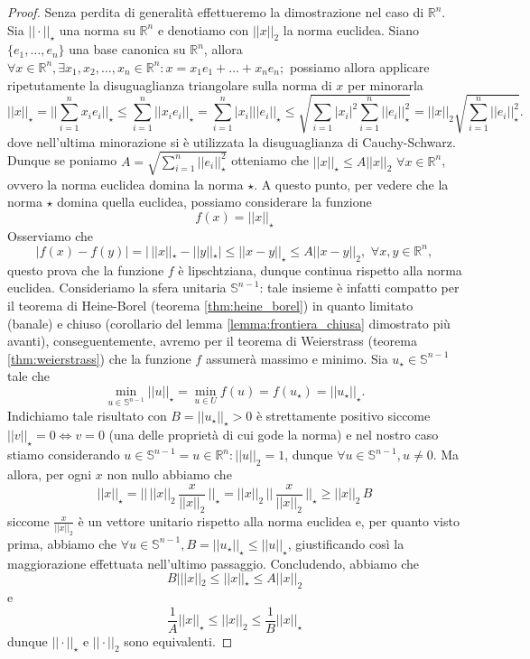 \begin{proof}
    Senza perdita di generalità effettueremo la dimostrazione nel caso di $\mathbb{R}^n$. Sia $|| \cdot ||_{\star}$ una norma su $\mathbb{R}^n$ e denotiamo con $||x||_2$ la norma euclidea. Siano $\{e_1, \ldots, e_n \}$ una base canonica su $\mathbb{R}^n$, allora $\forall x \in \mathbb{R}^n, \exists x_1, x_2, \ldots, x_n \in \mathbb{R}^n : x = x_1 e_1 + \ldots + x_n e_n;$ possiamo allora
    applicare ripetutamente la disuguaglianza triangolare sulla norma di $x$ per minorarla
    $$
    ||x||_{\star} = ||\sum_{i=1}^n x_i e_i ||_{\star} \leq \sum_{i=1}^n ||x_i e_i||_{\star} = \sum_{i=1}^n |x_i| ||e_i||_{\star} \leq \sqrt{\sum_{i=1} |x_i|^2 \sum_{i=1}^n ||e_i||^2_{\star}} = ||x||_2 \sqrt{\sum_{i=1}^n ||e_i||^2_{\star}}.
    $$
    dove nell'ultima minorazione si è utilizzata la disuguaglianza di Cauchy-Schwarz. \\
    Dunque se poniamo $A = \sqrt{\sum\limits_{i=1}^n ||e_i||^2_{\star}}$ otteniamo che $||x||_{\star} \leq A||x||_2 \, \, \forall x \in \mathbb{R}^n$, ovvero la norma euclidea domina la norma $\star$. A questo punto, per vedere che la norma $\star$ domina quella euclidea, possiamo considerare la funzione
    $$
    f(x) = ||x||_{\star}
    $$
    Osserviamo che
    $$
    |f(x) - f(y)| = | \, ||x||_{\star} - ||y||_{\star}| \leq ||x-y||_{\star} \leq A||x-y||_2, \, \, \forall x, y \in \mathbb{R}^n,
    $$
    questo prova che la funzione $f$ è lipschtziana, dunque continua rispetto alla norma euclidea. Consideriamo la sfera unitaria $\mathbb{S}^{n-1}$: tale insieme è infatti compatto per il teorema di Heine-Borel (teorema \ref{thm:heine_borel}) in quanto limitato (banale) e chiuso (corollario del lemma \ref{lemma:frontiera_chiusa} dimostrato più avanti), conseguentemente, avremo per il teorema di Weierstrass (teorema \ref{thm:weierstrass}) che 
    la funzione $f$ assumerà massimo e minimo. Sia $u_{\star} \in \mathbb{S}^{n-1}$ tale che
    $$
        \min_{u \in \mathbb{S}^{n-1}} ||u||_{\star} = \min_{u \in U} f(u) = f(u_{\star}) = ||u_{\star}||_{\star}.
    $$
    Indichiamo tale risultato con $B = ||u_{\star}||_{\star} > 0$ è strettamente positivo siccome $||v||_{\star} = 0 \iff v = 0$ (una delle proprietà di cui gode la norma) e nel nostro caso stiamo considerando $u \in \mathbb{S}^{n-1} = {u \in \mathbb{R}^n : ||u||_2 = 1}$, dunque $\forall u \in \mathbb{S}^{n-1}, u \neq 0$. Ma allora, per ogni $x$ non nullo abbiamo che
    $$
    ||x||_{\star} = || \, ||x||_2 \, \frac{x}{||x||_2} \, ||_{\star} = ||x||_2 \, || \, \frac{x}{||x||_2} \, ||_{\star} \geq ||x||_2 \, B
    $$
    siccome $\frac{x}{||x||_2}$ è un vettore unitario rispetto alla norma euclidea e, per quanto visto prima, abbiamo che $\forall u \in \mathbb{S}^{n-1}, B = ||u_{\star}||_{\star} \leq ||u||_{\star}$, giustificando così la maggiorazione effettuata nell'ultimo passaggio. Concludendo, abbiamo che
    $$
        B |||x||_2 \leq ||x||_{\star} \leq A ||x||_2
    $$
    e
    $$
        \frac{1}{A} ||x||_{\star} \leq ||x||_2 \leq \frac{1}{B} ||x||_{\star}
    $$
    dunque $||\cdot||_{\star}$ e $||\cdot||_2$ sono equivalenti.
\end{proof}
